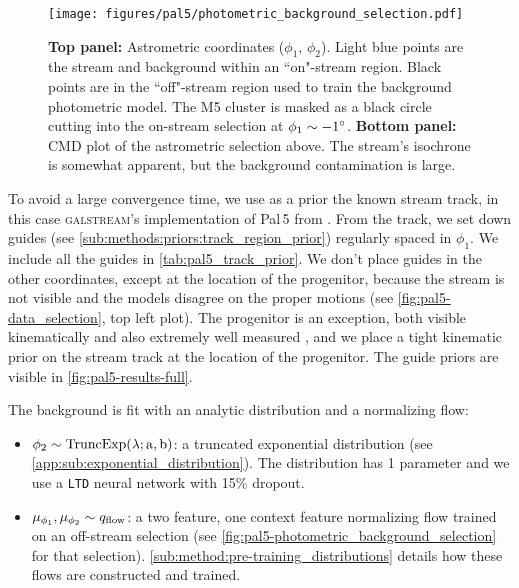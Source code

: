 \documentclass[twocolumn]{aastex631}
\newcommand{\code}[1]{\textsc{#1}}
\newcommand{\package}[1]{\code{#1}}
\newcommand{\stream}[1]{#1}
\begin{document}
        \begin{figure}[ht]
            \centering
            \texttt{[image: figures/pal5/photometric\_background\_selection.pdf]}
            \caption{%
                \textbf{Top panel:} Astrometric coordinates ($\phi_1$,
                $\phi_2$).  Light blue points are the stream and background
                within an ``on"-stream region. Black points are in the
                ``off"-stream region used to train the background photometric
                model. The \stream{M5} cluster is masked as a black circle
                cutting into the on-stream selection at $\phi_1\sim-1\degree$.
                \textbf{Bottom panel:} CMD plot of the astrometric selection
                above. The stream's isochrone is somewhat apparent, but the
                background contamination is large.
            }
            \label{fig:pal5-photometric_background_selection}
        \end{figure}
        
        To avoid a large convergence time, we use as a prior the known stream
        track, in this case \package{galstream}'s \citep{Mateu2022}
        implementation of \stream{Pal\,5} from \citet{Ibata+2021}. From the
        track, we set down guides (see
        \autoref{sub:methods:priors:track_region_prior}) regularly spaced in
        $\phi_1$. We include all the guides in \autoref{tab:pal5_track_prior}.
        We don't place guides in the other coordinates, except at the location
        of the progenitor, because the stream is not visible and the models
        disagree on the proper motions (see \autoref{fig:pal5-data_selection},
        top left plot).  The progenitor is an exception, both visible
        kinematically and also extremely well measured
        \citep{VasilievBaumgardt2021}, and we place a tight kinematic prior on
        the stream track at the location of the progenitor.  The guide priors
        are visible in \autoref{fig:pal5-results-full}.

        The background is fit with an analytic distribution and a normalizing
        flow:
        \begin{itemize}
            \setlength\itemsep{0em}
            \item $\phi_2 \sim \rm{TruncExp}(\lambda; a, b)$: a truncated
                exponential distribution (see
                \autoref{app:sub:exponential_distribution}).  The distribution
                has 1 parameter and we use a \texttt{LTD} neural network with
                15\% dropout.
            \item $\mu_{\phi_1}, \mu_{\phi_2} \sim q_{\rm flow}$: a two feature,
                one context feature normalizing flow trained on an off-stream
                selection (see
                \autoref{fig:pal5-photometric_background_selection} for that
                selection). \autoref{sub:method:pre-training_distributions}
                details how these flows are constructed and trained.
        \end{itemize}
\end{document}
